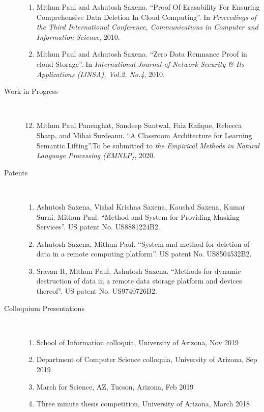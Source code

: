 \documentclass[10pt]{article}
\newcommand{\ve}[1]{{\em #1}} %
\newcommand{\ti}[1]{``#1''} %
\begin{document}
\begin{description}
\begin{enumerate}
\item  Mithun Paul and Ashutosh Saxena.   \ti{Proof Of Erasability For Ensuring Comprehensive Data Deletion In Cloud Computing}. In \ve{  Proceedings of the Third International Conference, Communications in Computer and Information Science}, 2010.

\item  Mithun Paul and Ashutosh Saxena.   \ti{Zero Data Remnance Proof in cloud Storage}. In \ve{  International Journal of Network Security \& Its Applications (IJNSA), Vol.2, No.4}, 2010.




\end{enumerate}


\item [Work in Progress] \
\begin{enumerate}
\setcounter{enumi}{11}



\item Mithun Paul Panenghat, Sandeep Suntwal, Faiz Rafique, Rebecca Sharp, and Mihai Surdeanu.   \ti{A Classroom Architecture for Learning Semantic Lifting}.To be submitted to \ve {the Empirical Methods in Natural Language Processing (EMNLP)}, 2020.

\end{enumerate}


\item [Patents] \
\begin{enumerate}


\item 
Ashutosh Saxena, Vishal Krishna Saxena, Kaushal Saxena, Kumar Surni, Mithun Paul. \ti{Method and System for Providing Masking Services}.  US patent No. US8881224B2.
\item 
Ashutosh Saxena, Mithun Paul. \ti{System and method for deletion of data in a remote computing platform}.  US patent No. US8504532B2.
\item 
Sravan R, Mithun Paul, Ashutosh Saxena. \ti{Methods for dynamic destruction of data in a remote data storage platform and devices thereof}.  US patent No. US9740726B2.


\end{enumerate}




\item [Colloquium Presentations]\

\begin{enumerate}

\item School of Information colloquia, University of Arizona, Nov 2019
\item Department of Computer Science colloquia, University of Arizona, Sep 2019
\item March for Science, AZ, Tucson, Arizona, Feb 2019
\item Three minute thesis competition, University of Arizona, March 2018

\end{enumerate}



\end{description}
\end{document}
